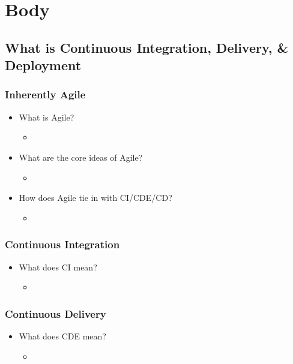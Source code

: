 \documentclass[11pt,a4paper]{article}
\begin{document}
\section{Body}
	\subsection{What is Continuous Integration, Delivery, \& Deployment}
		\subsubsection{Inherently Agile}
		\begin{itemize}[noitemsep]
			\item What is Agile? 
			\begin{itemize}
				\item
			\end{itemize}
			\item What are the core ideas of Agile?
			\begin{itemize}
				\item
			\end{itemize}
			\item How does Agile tie in with CI/CDE/CD?
			\begin{itemize}
				\item
			\end{itemize}
		\end{itemize}
		\vspace{-7mm}
		\subsubsection{Continuous Integration}
		\begin{itemize}[noitemsep]
			\item What does CI mean?
			\begin{itemize}
				\item
			\end{itemize}
		\end{itemize}
		\subsubsection{Continuous Delivery}
		\begin{itemize}[noitemsep]
			\item What does CDE mean?
			\begin{itemize}
				\item
			\end{itemize}
		\end{itemize}
\end{document}
